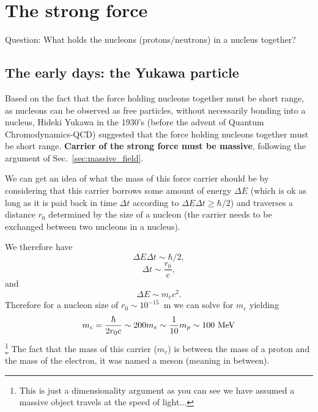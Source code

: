 \section{The strong force}

Question: What holds the nucleons (protons/neutrons) in a nucleus together?

\subsection{The early days: the Yukawa particle}

Based on the fact that the force holding nucleons together must be short range, as nucleons can be observed as free particles, without necessarily bonding into a nucleus, Hideki Yukawa in the 1930's (before the advent of Quantum Chromodynamics-QCD) suggested that the force holding nucleons together must be short range. {\bf Carrier of the strong force must be massive}, following the argument of Sec.~\ref{sec:massive_field}.

We can get an idea of what the mass of this force carrier should be by
considering that this carrier borrows some amount of energy $\Delta E$ (which is ok as long as it is paid back in time $\Delta t$ according to $\Delta E\Delta t\geq\hbar/2$) and traverses a distance $r_0$ determined by the size of a nucleon (the carrier needs to be exchanged between two nucleons in a nucleus).

We therefore have 
\[\Delta E\Delta t\sim\hbar/2,\]
\[\Delta t \sim\frac{r_0}{c},\] 
and \[\Delta E\sim m_{c}c^2.\]
Therefore for a nucleon size of $r_0\sim 10^{-15}$~m we can solve for $m_c$
yielding \[m_c=\frac{\hbar}{2r_0c}\sim 200m_e\sim \frac{1}{10}m_p\sim100~{\rm MeV}\]\footnote{This is just a dimensionality argument as you can see we have assumed a massive object travels at the speed of light...}
The fact that the mass of this carrier ($m_c$) is between the mass of a proton and the mass of the electron, it was named a meson (meaning in between).

